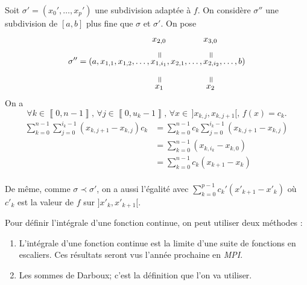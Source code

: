 \begin{prv}
	Soit $\sigma ' = (x_0', \ldots, x_p')$ une subdivision adaptée à $f$. On considère $\sigma''$ une subdivision de $[a,b]$ plus fine que $\sigma$ et $\sigma'$. On pose
	\begin{align*}
		\phantom{\sigma'' = (a, x_{1,1}, x_{1,2},\ldots,}\mathrlap{x_{2,0}}\phantom{x_{1,i_1},x_{2,1},\ldots,}\mathrlap{x_{3,0}}\phantom{x_{2,i_2},\ldots,b)}\\[-1mm]
		\phantom{\sigma'' = (a, x_{1,1}, x_{1,2},\ldots,}\mathrlap{~~\vrt=}\phantom{x_{1,i_1},x_{2,1},\ldots,}\mathrlap{~~\vrt=}\phantom{x_{2,i_2},\ldots,b)}\\[-2mm]
		\sigma'' = (a, x_{1,1}, x_{1,2},\ldots,x_{1,i_1},x_{2,1},\ldots,x_{2,i_2},\ldots,b)\\
		\phantom{\sigma'' = (a, x_{1,1}, x_{1,2},\ldots,}\mathrlap{~~\vrt=}\phantom{x_{1,i_1},x_{2,1},\ldots,}\mathrlap{~~\vrt=}\phantom{x_{2,i_2},\ldots,b)}\\[-2mm]
		\phantom{\sigma'' = (a, x_{1,1}, x_{1,2},\ldots,}\mathrlap{~x_1}\phantom{x_{1,i_1},x_{2,1},\ldots,}\mathrlap{~x_2}\phantom{x_{2,i_2},\ldots,b)}
	\end{align*}
	On a \[
		\forall k \in \left\llbracket 0,n-1 \right\rrbracket,\, \forall j \in \left\llbracket 0,u_k - 1 \right\rrbracket,\,\forall x \in \,]x_{k,j},x_{k,j+1}[,\,f(x) = c_k
	.\]
	\begin{align*}
		\sum_{k=0}^{n-1}\sum_{j=0}^{i_k - 1} (x_{k,j+1} - x_{k,j}) c_k
		&= \sum_{k=0}^{n-1}c_k \sum_{j=0}^{i_k - 1} (x_{k,j+1} - x_{k,j}) \\
		&= \sum_{k=0}^{n-1}(x_{k,i_k} - x_{k,0}) \\
		&= \sum_{k=0}^{n-1}c_k (x_{k+1} - x_k) \\
	\end{align*}

	De même, comme $\sigma \prec \sigma'$, on a aussi l'égalité avec $\sum_{k=0}^{p-1} c_k'(x'_{k+1} - x'_k)$ où $c'_k$ est la valeur de $f$ sur $]x'_k,x'_{k+1}[$.
\end{prv}

Pour définir l'intégrale d'une fonction continue, on peut utiliser deux méthodes :
\begin{enumerate}
	\item L'intégrale d'une fonction continue est la limite d'une suite de fonctions en escaliers. Ces résultats seront vus l'année prochaine en {\it MPI}.
	\item Les sommes de Darboux; c'est la définition que l'on va utiliser.
\end{enumerate}


